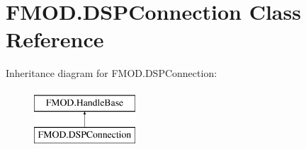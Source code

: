 \hypertarget{class_f_m_o_d_1_1_d_s_p_connection}{}\section{F\+M\+O\+D.\+D\+S\+P\+Connection Class Reference}
\label{class_f_m_o_d_1_1_d_s_p_connection}
Inheritance diagram for F\+M\+O\+D.\+D\+S\+P\+Connection\+:\begin{figure}[H]
\begin{center}
\leavevmode
\includegraphics[height=2.000000cm]{class_f_m_o_d_1_1_d_s_p_connection}
\end{center}
\end{figure}
